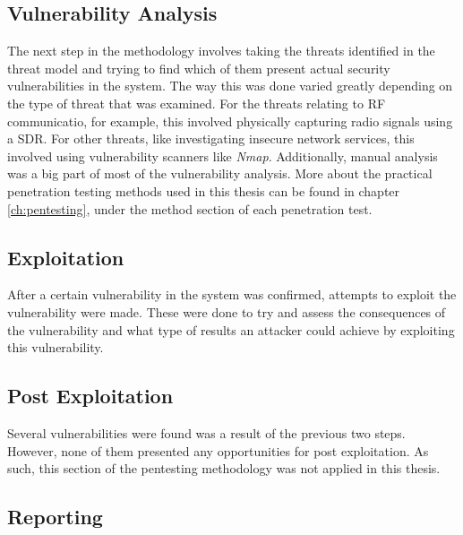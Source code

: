 \subsection{Vulnerability Analysis}
The next step in the methodology involves taking the threats identified in the threat model and trying to find which of them present actual security vulnerabilities in the system. The way this was done varied greatly depending on the type of threat that was examined. For the threats relating to \gls{RF} communicatio, for example, this involved physically capturing radio signals using a \gls{SDR}. For other threats, like investigating insecure network services, this involved using vulnerability scanners like \textit{Nmap}. Additionally, manual analysis was a big part of most of the vulnerability analysis. More about the practical penetration testing methods used in this thesis can be found in chapter \ref{ch:pentesting}, under the method section of each penetration test.

\subsection{Exploitation}
After a certain vulnerability in the system was confirmed, attempts to exploit the vulnerability were made. These were done to try and assess the consequences of the vulnerability and what type of results an attacker could achieve by exploiting this vulnerability.

\subsection{Post Exploitation}
Several vulnerabilities were found was a result of the previous two steps. However, none of them presented any opportunities for post exploitation. As such, this section of the pentesting methodology was not applied in this thesis.

\subsection{Reporting}
\todo

